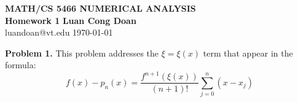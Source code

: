 \documentclass[14pt,a4paper]{article}
\begin{document}
\label{cover}
\begin{center}
	\vspace*{3cm}
	\large{\textbf{MATH/CS 5466 NUMERICAL ANALYSIS \\ Homework 1}}
	\vfill
	\textbf{Luan Cong Doan} \\ luandoan@vt.edu
	\vfill
	\today
\end{center}
\pagebreak

\label{Answer Sheet}
\label{Numerical Exercise}
\doublespacing
\large\textbf{Problem 1.} This problem addresses the $\xi = \xi(x)$ term that appear in the formula: 
\hspace*{4cm} $$ f(x) - p_n(x) = \dfrac{f^{n+1}(\xi(x))}{(n+1)!}\sum_{j=0}^{n}(x-x_j) $$ 
\end{document}
